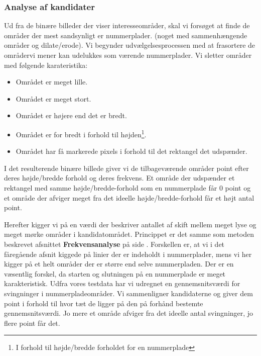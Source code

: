 
\subsubsection*{Analyse af kandidater}
\label{sec_kandidater}
Ud fra de binære billeder der viser interesseområder, skal vi forsøget at finde de områder der mest sandsynligt er nummerplader. (noget med sammenhængende områder og dilate/erode). Vi begynder udvælgelsesprocessen med at frasortere de områdervi mener kan udelukkes som værende nummerplader. Vi sletter områder med følgende karateristika:
\begin{itemize}
\item Området er meget lille.
\item Området er meget stort.
\item Området er højere end det er bredt.
\item Området er for bredt i forhold til højden\footnote{I forhold til højde/bredde forholdet for en nummerplade}.
\item Området har få markerede pixels i forhold til det rektangel det udspænder.
\end{itemize}


I det resulterende binære billede giver vi de tilbageværende områder point efter deres højde/bredde forhold og deres frekvens. Et område der udspænder et rektangel med samme højde/bredde-forhold som en nummerplade får 0 point og et område der afviger meget fra det ideelle højde/bredde-forhold får et højt antal point.

Herefter kigger vi på en værdi der beskriver antallet af skift mellem meget lyse og meget mørke områder i kandidatområdet. Princippet er det samme som metoden beskrevet afsnittet \textbf{Frekvensanalyse} på side \pageref{sec_frekvensanalyse}. Forskellen er, at vi i det fåregående afsnit kiggede på linier der er indeholdt i nummerplader, mens vi her kigger på et helt områder der er større end selve nummerpladen. Der er en væsentlig forskel, da starten og slutningen på en nummerplade er meget karakteristisk. Udfra vores testdata har vi udregnet en gennemsnitsværdi for svingninger i nummerpladeområder. Vi sammenligner kandidaterne og giver dem point i forhold til hvor tæt de ligger på den på forhånd bestemte gennemsnitsværdi. Jo mere et område afviger fra det ideelle antal svingninger, jo flere point får det.

